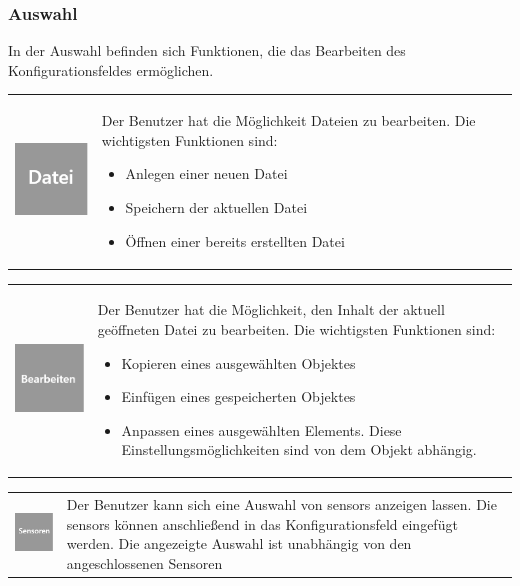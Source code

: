 \documentclass[parskip=full]{scrartcl}
\begin{document}
\subsubsection{Auswahl}

In der Auswahl befinden sich Funktionen, die das Bearbeiten des Konfigurationsfeldes ermöglichen.

\begin{tabular}[t]{p{1cm} p{10cm}} %
	\vspace{0cm}\includegraphics[width = 1 cm]{Grafik/Datei.png} & Der Benutzer hat die Möglichkeit Dateien zu bearbeiten. Die wichtigsten Funktionen sind:
	\begin{itemize} 
		\item Anlegen einer neuen Datei
		\item Speichern der aktuellen Datei
		\item Öffnen einer bereits erstellten Datei
	\end{itemize}\\
\end{tabular}

\begin{tabular}[t]{p{1cm} p{10cm}} %
	\vspace{0cm}\includegraphics[width = 1 cm]{Grafik/Bearbeiten.png} & Der Benutzer hat die Möglichkeit, den Inhalt der aktuell geöffneten Datei zu bearbeiten. Die wichtigsten Funktionen sind:
	\begin{itemize} 
		\item Kopieren eines ausgewählten Objektes
		\item Einfügen eines gespeicherten Objektes
		\item Anpassen eines ausgewählten Elements. Diese Einstellungsmöglichkeiten sind von dem Objekt abhängig.
	\end{itemize}
\end{tabular}

\begin{tabular}[t]{p{1cm} p{10cm}} %
	\vspace{0cm}\includegraphics[width = 1 cm]{Grafik/Sensor.png} & Der Benutzer kann sich eine Auswahl von \glspl{sensor} anzeigen lassen. Die \glspl{sensor} können anschließend in das Konfigurationsfeld eingefügt werden. Die angezeigte Auswahl ist unabhängig von den angeschlossenen Sensoren\newline
\end{tabular}
\end{document}
